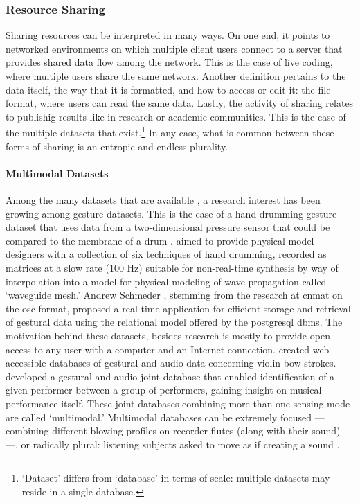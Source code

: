 \subsubsection{Resource Sharing}
{
	Sharing resources can be interpreted in many ways. On one end, it points to networked environments on which multiple client users connect to a server that provides shared data flow among the network. This is the case of live coding, where multiple users share the same network. Another definition pertains to the data itself, the way that it is formatted, and how to access or edit it: the file format, where users can read the same data. Lastly, the activity of sharing relates to publishig results like in research or academic communities. This is the case of the multiple datasets that exist.\footnote{`Dataset' differs from `database' in terms of scale: multiple datasets may reside in a single database.} In any case, what is common between these forms of sharing is an entropic and endless plurality.

	\paragraph{Multimodal Datasets}
	Among the many datasets that are available , a research interest has been growing among gesture datasets. This is the case of a hand drumming gesture dataset that uses data from a two-dimensional pressure sensor that could be compared to the membrane of a drum \parencite{DBLP:conf/icmc/JonesLS07}. \citeauthor{DBLP:conf/icmc/JonesLS07} aimed to provide physical model designers with a collection of six techniques of hand drumming, recorded as matrices at a slow rate (100 Hz) suitable for non-real-time synthesis by way of interpolation into a model for physical modeling of wave propagation called `waveguide mesh.' Andrew Schmeder \parencite{icmc/bbp2372.2009.005}, stemming from the research at \gls{cnmat} on the \gls{osc} format, proposed a real-time application for efficient storage and retrieval of gestural data using the relational model offered by the \gls{postgresql} \gls{dbms}. The motivation behind these datasets, besides research is mostly to provide open access to any user with a computer and an Internet connection. \textcite{Young2007} created web-accessible databases of gestural and audio data concerning violin bow strokes. \textcite{Hochenbaum2010} developed a gestural and audio joint database that enabled identification of a given performer between a group of performers, gaining insight on musical performance itself. These joint databases combining more than one sensing mode are called `multimodal.' Multimodal databases can be extremely focused ---combining different blowing profiles on recorder flutes (along with their sound) \parencite{Garcia2011}---, or radically plural: listening subjects asked to move as if creating a sound \parencite{fvisi:2017}. 

}
